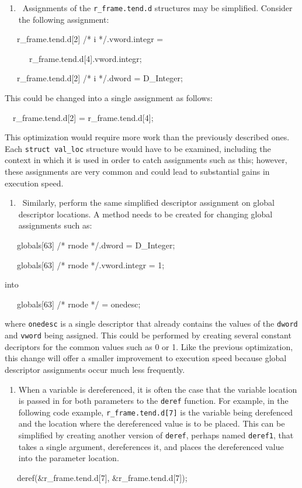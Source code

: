 \liststyleLxxxix
\begin{enumerate}
\item 
\ Assignments of the \texttt{r\_frame.tend.d} structures may be simplified. Consider the following assignment:
\end{enumerate}
{\ttfamily\mdseries
\ \ \ r\_frame.tend.d[2] /* i */.vword.integr =}

{\ttfamily\mdseries
\ \ \ \ \ \ r\_frame.tend.d[4].vword.integr;}

{\ttfamily\mdseries
\ \ \ r\_frame.tend.d[2] /* i */.dword = D\_Integer;}


This could be changed into a single assignment as follows:

{\ttfamily\mdseries
\ \ r\_frame.tend.d[2] = r\_frame.tend.d[4];}


This optimization would require more work than the previously
described ones. Each \texttt{struct val\_loc} structure would have
to be examined, including the context in which it is used in order to
catch assignments such as this; however, these assignments are very
common and could lead to substantial gains in execution speed.

\liststyleLxl
\begin{enumerate}
\item 
\ Similarly, perform the same simplified descriptor assignment on global descriptor locations. A method needs to be
created for changing global assignments such as:
\end{enumerate}
{\ttfamily\mdseries
\ \ \ globals[63] /* rnode */.dword = D\_Integer;}

{\ttfamily\mdseries
\ \ \ globals[63] /* rnode */.vword.integr = 1;}


into

{\ttfamily\mdseries
\ \ \ globals[63] /* rnode */ = onedesc;}

\noindent where \texttt{onedesc} is a single descriptor that already
contains the values of the \texttt{dword} and \texttt{vword} being
assigned. This could be performed by creating several constant
decriptors for the common values such as 0 or 1.  Like the previous
optimization, this change will offer a smaller improvement to
execution speed because global descriptor assignments occur much less
frequently.

\liststyleLxli
\begin{enumerate}
\item 
When a variable is dereferenced, it is often the case that the variable location is passed in for both parameters to
the \texttt{deref} function. For example, in the following code example, \texttt{r\_frame.tend.d[7]} is the variable
being derefenced and the location where the dereferenced value is to be placed. This can be simplified by creating
another version of \texttt{deref}, perhaps named \texttt{deref1}, that takes a single argument, dereferences it, and
places the dereferenced value into the parameter location.
\end{enumerate}
{\ttfamily\mdseries
\ \ \ deref(\&r\_frame.tend.d[7], \&r\_frame.tend.d[7]);}

